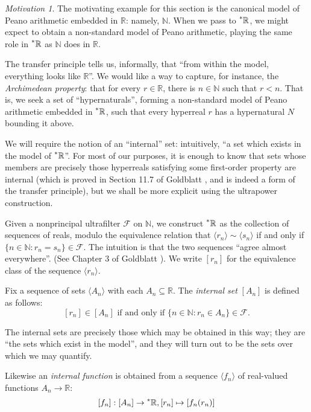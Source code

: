 \documentclass[11pt]{amsart}
\theoremstyle{remark}
\newtheorem*{motivation}{Motivation}
\newcommand{\hyp}[1][\mathbb{R}]{\prescript{*}{}{#1}}
\begin{document}
\begin{motivation}
The motivating example for this section is the canonical model of Peano arithmetic embedded in $\mathbb{R}$: namely, $\mathbb{N}$.
When we pass to $\hyp$, we might expect to obtain a non-standard model of Peano arithmetic, playing the same role in $\hyp$ as $\mathbb{N}$ does in $\mathbb{R}$.

The transfer principle tells us, informally, that ``from within the model, everything looks like $\mathbb{R}$''.
We would like a way to capture, for instance, the \emph{Archimedean property}: that for every $r \in \mathbb{R}$, there is $n \in \mathbb{N}$ such that $r < n$.
That is, we seek a set of ``hypernaturals'', forming a non-standard model of Peano arithmetic embedded in $\hyp$, such that every hyperreal $r$ has a hypernatural $N$ bounding it above.
\end{motivation}

We will require the notion of an ``internal'' set: intuitively, ``a set which exists in the model of $\hyp$''.
For most of our purposes, it is enough to know that sets whose members are precisely those hyperreals satisfying some first-order property are internal (which is proved in Section 11.7 of Goldblatt \cite{goldblatt}, and is indeed a form of the transfer principle), but we shall be more explicit using the ultrapower construction.

Given a nonprincipal ultrafilter $\mathcal{F}$ on $\mathbb{N}$, we construct $\hyp$ as the collection of sequences of reals, modulo the equivalence relation that $\langle r_n \rangle \sim \langle s_n \rangle$ if and only if $\{ n \in \mathbb{N} : r_n = s_n \} \in \mathcal{F}$.
The intuition is that the two sequences ``agree almost everywhere''.
(See Chapter 3 of Goldblatt \cite{goldblatt}).
We write $[r_n]$ for the equivalence class of the sequence $\langle r_n \rangle$.

Fix a sequence of sets $\langle A_n \rangle$ with each $A_n \subseteq \mathbb{R}$.
The \emph{internal set} $[A_n]$ is defined as follows:
$$\text{$[r_n] \in [A_n]$ if and only if $\{ n \in \mathbb{N} : r_n \in A_n \} \in \mathcal{F}$.}$$

The internal sets are precisely those which may be obtained in this way; they are ``the sets which exist in the model'', and they will turn out to be the sets over which we may quantify.

Likewise an \emph{internal function} is obtained from a sequence $\langle f_n \rangle$ of real-valued functions $A_n \to \mathbb{R}$: $$[f_n]: [A_n] \to \hyp, [r_n] \mapsto [f_n(r_n)]$$
\end{document}
